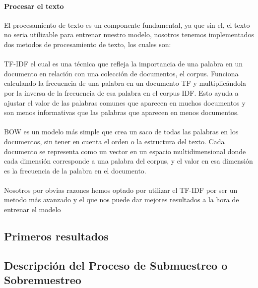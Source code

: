 \documentclass{report}
\begin{document}
          \paragraph*{Procesar el texto}   
          {El procesamiento de texto es un componente fundamental, ya que sin el, el texto no seria utilizable para entrenar nuestro modelo, nosotros tenemos implementados dos metodos de procesamiento de texto, los cuales son:      
            \\
            \\
          TF-IDF el cual es una técnica que refleja la importancia de una palabra en un documento en relación con una colección de documentos, el corpus. Funciona calculando la frecuencia de una palabra en un documento TF y multiplicándola por la inversa de la frecuencia de esa palabra en el corpus IDF. Esto ayuda a ajustar el valor de las palabras comunes que aparecen en muchos documentos y son menos informativas que las palabras que aparecen en menos documentos.      
            \\
            \\
          BOW es un modelo más simple que crea un saco de todas las palabras en los documentos, sin tener en cuenta el orden o la estructura del texto. Cada documento se representa como un vector en un espacio multidimensional donde cada dimensión corresponde a una palabra del corpus, y el valor en esa dimensión es la frecuencia de la palabra en el documento. 
            \\
            \\
          Nosotros por obvias razones hemos optado por utilizar el TF-IDF por ser un metodo más avanzado y el que nos puede dar mejores resultados a la hora de entrenar el modelo
          }    
                

    

            \subsection{Primeros resultados}
            \subsection{Descripción del Proceso de Submuestreo o Sobremuestreo}
\end{document}
